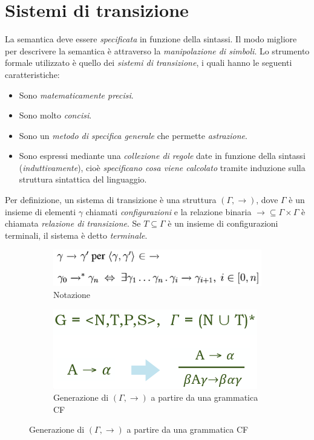 \documentclass[a4paper,oneside,titlepage]{book}
\begin{document}
\section{Sistemi di transizione}
La semantica deve essere \textit{specificata} in funzione della sintassi. Il modo migliore per descrivere la semantica è attraverso la \textit{manipolazione di simboli}. Lo strumento formale utilizzato è quello dei \textit{sistemi di transizione}, i quali hanno le seguenti caratteristiche:
\begin{itemize}
	\item Sono \textit{matematicamente precisi}.
	\item Sono molto \textit{concisi}.
	\item Sono un \textit{metodo di specifica generale} che permette \textit{astrazione}.
	\item Sono espressi mediante una \textit{collezione di regole} date in funzione della sintassi (\textit{induttivamente}), cioè \textit{specificano cosa viene calcolato} tramite induzione sulla struttura sintattica del linguaggio.
\end{itemize}
Per definizione, un sistema di transizione è una struttura $(\Gamma,\rightarrow)$, dove $\Gamma$ è un insieme di elementi $\gamma$ chiamati \textit{configurazioni} e la relazione binaria $\rightarrow \subseteq \Gamma \times \Gamma$ è chiamata \textit{relazione di transizione}. Se $T \subseteq \Gamma$ è un insieme di configurazioni terminali, il sistema è detto \textit{terminale}.
\begin{figure}[htp]
	\begin{subfigure}{0.49\textwidth}
		\includegraphics[width=\textwidth, height=\textheight, keepaspectratio]{sdt1.png} 
		\caption{Notazione}
	\end{subfigure}
	\hfill
	\begin{subfigure}{0.49\textwidth}
		\includegraphics[width=\textwidth, height=\textheight, keepaspectratio]{sdt2.png}
		\caption{Generazione di $(\Gamma,\rightarrow)$ a partire da una grammatica CF}
	\end{subfigure}
\end{figure}
\end{document}
